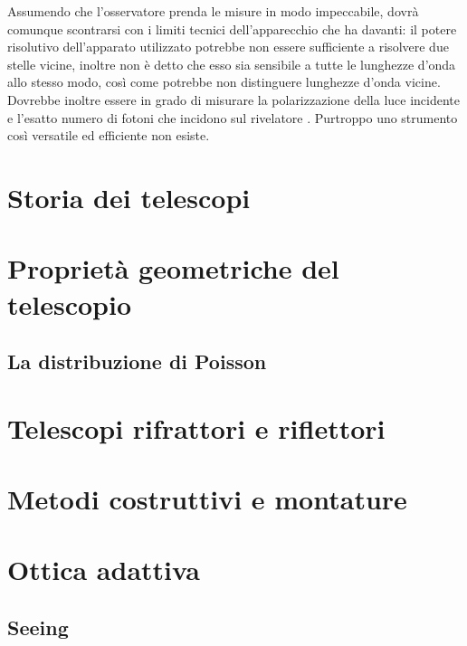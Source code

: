         Assumendo che l'osservatore prenda le misure in modo impeccabile, dovrà comunque scontrarsi con i limiti tecnici dell'apparecchio che ha davanti: il potere risolutivo dell'apparato utilizzato potrebbe non essere sufficiente a risolvere due stelle vicine, inoltre non è detto che esso sia sensibile a tutte le lunghezze d'onda allo stesso modo, così come potrebbe non distinguere lunghezze d'onda vicine. Dovrebbe inoltre essere in grado di misurare la polarizzazione della luce incidente e l'esatto numero di fotoni che incidono sul rivelatore \myetc. Purtroppo uno strumento così versatile ed efficiente non esiste.
    \section{Storia dei telescopi}
    \section{Proprietà geometriche del telescopio}
        \subsection{La distribuzione di Poisson}
    \section{Telescopi rifrattori e riflettori}
    \section{Metodi costruttivi e montature}
    \section{Ottica adattiva}
        \subsection{Seeing}